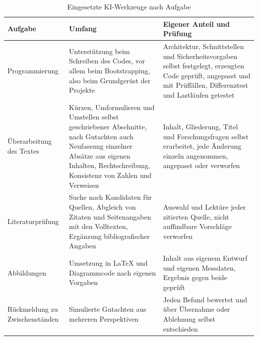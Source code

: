 \begin{table}[H]
  \caption{Eingesetzte KI-Werkzeuge nach Aufgabe}
  \label{tab:ki-verzeichnis}
  \small
  \begin{tabularx}{\textwidth}{@{}>{\RaggedRight\arraybackslash}p{} >{\RaggedRight\arraybackslash}X >{\RaggedRight\arraybackslash}p{}@{}}
    \hline
    Aufgabe & Umfang & Eigener Anteil und Prüfung \\
    \hline
    Programmierung & Unterstützung beim Schreiben des Codes, vor allem beim Bootstrapping, also beim Grundgerüst der
      Projekte & Architektur, Schnittstellen und Sicherheitsvorgaben selbst festgelegt, erzeugten Code geprüft,
      angepasst und mit Prüffällen, Differenztest und Lastläufen getestet \\
    Überarbeitung des Textes & Kürzen, Umformulieren und Umstellen selbst geschriebener Abschnitte, nach
      Gutachten auch Neufassung einzelner Absätze aus eigenen Inhalten, Rechtschreibung, Konsistenz von Zahlen und
      Verweisen & Inhalt, Gliederung, Titel und Forschungsfragen selbst erarbeitet, jede Änderung einzeln angenommen,
      angepasst oder verworfen \\
    Literaturprüfung & Suche nach Kandidaten für Quellen, Abgleich von Zitaten und Seitenangaben mit den Volltexten,
      Ergänzung bibliografischer Angaben & Auswahl und Lektüre jeder zitierten Quelle, nicht auffindbare Vorschläge
      verworfen \\
    Abbildungen & Umsetzung in \LaTeX{} und Diagrammcode nach eigenen Vorgaben & Inhalt aus eigenem Entwurf und
      eigenen Messdaten, Ergebnis gegen beide geprüft \\
    Rückmeldung zu Zwischenständen & Simulierte Gutachten aus mehreren Perspektiven & Jeden Befund bewertet und über
      Übernahme oder Ablehnung selbst entschieden \\
    \hline
  \end{tabularx}
\end{table}
